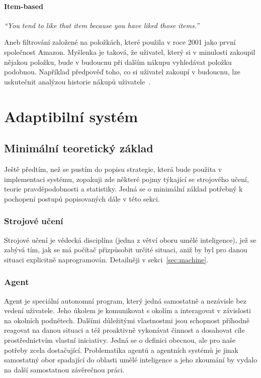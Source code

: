 \documentclass[thesis=M,czech]{FITthesis}[2014/05/07]
\begin{document}
\subsubsection{Item-based}

\emph{``You tend to like that item because you have liked those items.''}~\cite{cf}

Aneb filtrování založené na položkách, které použila v roce 2001 jako první společnost Amazon. Myšlenka je taková, že uživatel, který si v minulosti zakoupil nějakou položku, bude v budoucnu při dalším nákupu vyhledávat položku podobnou. Například předpověď toho, co si uživatel zakoupí v budoucnu, lze uskutečnit analýzou historie nákupů uživatele~\cite{itemcf}. 

\chapter{Adaptibilní systém}
\label{chap:adapt}

\section{Minimální teoretický základ}

Ještě předtím, než se pustím do popisu strategie, která bude použita v implementaci systému, zopakuji zde některé pojmy týkající se strojového učení, teorie pravděpodobnosti a statistiky. Jedná se o minimální základ potřebný k pochopení postupů popisovaných dále v této sekci. 

\subsection{Strojové učení}
Strojové učení je vědecká disciplína (jedna z větví oboru umělé inteligence), jež se zabývá tím, jak se má počítač přizpůsobit určité situaci, aniž by byl pro danou situaci explicitně naprogramován. Detailněji v sekci~\ref{sec:machine}.

\subsection{Agent}
Agent je speciální autonomní program, který jedná samostatně a nezávisle bez vedení uživatele. Jeho úkolem je komunikovat s okolím a interagovat v závislosti na okolních podnětech. Dalšími důležitými vlastnostmi jsou schopnost příhodně reagovat na danou situaci a též proaktivně vykonávat činnost a dosahovat cíle prostřednictvím vlastní iniciativy. Jedná se o definici obecnou, ale pro naše potřeby zcela dostačující. Problematika agentů a agentních systémů je jinak samostatný obor spadající do oblasti umělé inteligence a jeho zkoumání by vydalo na další samostatnou závěrečnou práci. 
\end{document}
